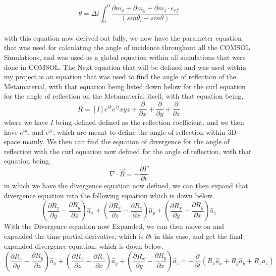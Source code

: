 \documentclass[]{article}
\begin{document}
\begin{equation}
\theta = \Delta{i} \int_{0}^{0}  \frac{\partial{m}_x+\partial{m}_y + \partial{m}_z \cdot \epsilon_{rf}}{(sin\theta_i - sin\theta)} 
\end{equation}
\\
with this equation now derived out fully, we now have the parameter equation that was used for calculating the angle of incidence throughout all the COMSOL Simulations, and was used as a global equation within all simulations that were done in COMSOL. The Next equation that will be defined and was used within my project is an equation that was used to find the angle of reflection of the Metamaterial, with that equation being listed down below for the curl equation for the angle of reflection on the Metamaterial itself, with that equation being,
\begin{equation}
R = [I]e^{ik} e^{ij} xyz + \frac{\partial}{\partial{x}} +\frac{\partial}{\partial{y}} + \frac{\partial}{\partial{z}}
\end{equation}
where we have $I$ being defined defined as the reflection coefficient, and we then have $e^{ik}$, and $e^{ij}$, which are meant to define the angle of reflection within 3D space mainly. We then can find the equation of divergence for the angle of reflection with the curl equation now defined for the angle of reflection, with that equation being,
\begin{equation}
\nabla \cdot \vec{R} = -\frac{\partial{\Gamma}}{\partial{t}}
\end{equation}
in which we have the divergence equation now defined, we can then expand that divergence equation into the following equation which is down below.
\begin{equation}
\left(\frac{\partial{R}_z}{\partial{y}} - \frac{\partial{R}_y}{\partial{z}}\right)\hat{a}_x + \left(\frac{\partial{R}_x}{\partial{z}} - \frac{\partial{R}_z}{\partial{x}}\right)\hat{a}_y + \left(\frac{\partial{R}_x}{\partial{y}} - \frac{\partial{R}_y}{\partial{x}}\right)\hat{a}_z
\end{equation}
With the Divergence equation now Expanded, we can then move on and expanded the time partial derivative, which is $\partial{t}$ in this case, and get the final expanded divergence equation, which is down below.
\begin{equation}
\left(\frac{\partial{R}_z}{\partial{y}} - \frac{\partial{R}_y}{\partial{z}}\right)\hat{a}_x + \left(\frac{\partial{R}_x}{\partial{z}} - \frac{\partial{R}_z}{\partial{x}}\right)\hat{a}_y + \left(\frac{\partial{R}_x}{\partial{y}} - \frac{\partial{R}_y}{\partial{x}}\right)\hat{a}_z = -\frac{\partial}{\partial{t}}\left(R_x\hat{a}_x+R_y\hat{a}_y+R_z\hat{a}_z\right)
\end{equation}
\end{document}
